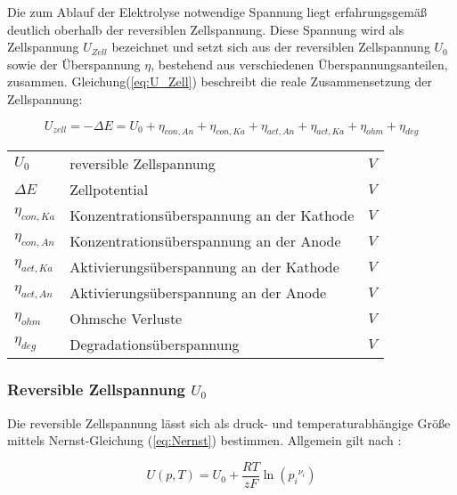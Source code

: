 \documentclass[onecolumn,10pt,titlepage]{article}
\begin{document}
	Die zum Ablauf der Elektrolyse notwendige Spannung liegt erfahrungsgemäß \cite{Zhang.2010,Buttler.2018} deutlich oberhalb der reversiblen Zellspannung. Diese Spannung wird als Zellspannung $U_{Zell}$ bezeichnet und setzt sich aus der reversiblen Zellspannung $U_0$ sowie der Überspannung $\eta$, bestehend aus verschiedenen Überspannungsanteilen, zusammen. Gleichung(\ref{eq:U_Zell}) beschreibt die reale Zusammensetzung der Zellspannung:
	
	\begin{equation}
	U_{zell}= -\Delta E = U_0 + \eta_{con,An} + \eta_{con,Ka} + \eta_{act,An} + \eta_{act,Ka} + \eta_{ohm} + \eta_{deg}
	\label{eq:U_Zell}
	\end{equation}
	
	\begin{table}[H]
		\begin{tabular*}{\textwidth}{lll}\\
			$U_0$&reversible Zellspannung&$V$\\
			$\Delta E$&Zellpotential&$V$\\
			$\eta_{con,Ka}$&Konzentrationsüberspannung an der Kathode&$V$\\
			$\eta_{con,An}$&Konzentrationsüberspannung an der Anode&$V$\\
			$\eta_{act,Ka}$&Aktivierungsüberspannung an der Kathode&$V$\\
			$\eta_{act,An}$&Aktivierungsüberspannung an der Anode&$V$\\
			$\eta_{ohm}$&Ohmsche Verluste&$V$\\
			$\eta_{deg}$&Degradationsüberspannung&$V$\\
		\end{tabular*}
	\end{table}
	
	
	\subsubsection*{Reversible Zellspannung $U_0$ }
	
	Die reversible Zellspannung lässt sich als druck- und temperaturabhängige Größe mittels Nernst-Gleichung (\ref{eq:Nernst}) bestimmen. Allgemein gilt nach \cite{NI.2007}:
	
	\begin{equation}
	U(p,T) = U_0 + \frac{RT}{zF}\ln{\left({p_i}^{\nu_{i}}\right)}
	\label{eq:Nernst}
	\end{equation}
	
\end{document}
